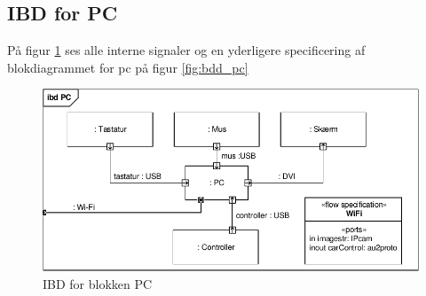 \subsection{IBD for PC}

På figur \ref{fig:ibd_pc} ses alle interne signaler og en yderligere specificering af blokdiagrammet for pc på figur \ref{fig:bdd_pc}

\begin{figure}[h]
\centering
\includegraphics[scale=1]{../fig/diagrammer/pc/ibd_pc.pdf}
\caption{IBD for blokken PC}
\label{fig:ibd_pc}
\end{figure}